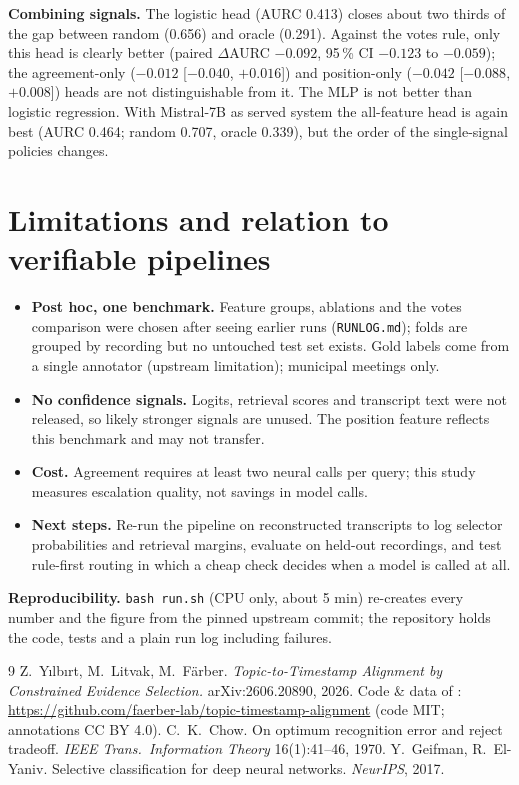 \documentclass[10pt,a4paper]{article}
\begin{document}
\textbf{Combining signals.} The logistic head (AURC 0.413) closes about two thirds of the gap between random (0.656) and oracle (0.291). Against the votes rule, only this head is clearly better (paired $\Delta$AURC $-0.092$, 95\,\% CI $-0.123$ to $-0.059$); the agreement-only ($-0.012$ [$-0.040$, $+0.016$]) and position-only ($-0.042$ [$-0.088$, $+0.008$]) heads are not distinguishable from it. The MLP is not better than logistic regression. With Mistral-7B as served system the all-feature head is again best (AURC 0.464; random 0.707, oracle 0.339), but the order of the single-signal policies changes.

\section{Limitations and relation to verifiable pipelines}
\begin{itemize}
\item \textbf{Post hoc, one benchmark.} Feature groups, ablations and the votes comparison were chosen after seeing earlier runs (\texttt{RUNLOG.md}); folds are grouped by recording but no untouched test set exists. Gold labels come from a single annotator (upstream limitation); municipal meetings only.
\item \textbf{No confidence signals.} Logits, retrieval scores and transcript text were not released, so likely stronger signals are unused. The position feature reflects this benchmark and may not transfer.
\item \textbf{Cost.} Agreement requires at least two neural calls per query; this study measures escalation quality, not savings in model calls.
\item \textbf{Next steps.} Re-run the pipeline on reconstructed transcripts to log selector probabilities and retrieval margins, evaluate on held-out recordings, and test rule-first routing in which a cheap check decides when a model is called at all.
\end{itemize}
\textbf{Reproducibility.} \texttt{bash run.sh} (CPU only, about 5 min) re-creates every number and the figure from the pinned upstream commit; the repository holds the code, tests and a plain run log including failures.

\footnotesize\begin{thebibliography}{9}
 Z.\ Yılbırt, M.\ Litvak, M.\ Färber. \emph{Topic-to-Timestamp Alignment by Constrained Evidence Selection.} arXiv:2606.20890, 2026.
 Code \& data of \cite{yilbirt}: \url{https://github.com/faerber-lab/topic-timestamp-alignment} (code MIT; annotations CC BY 4.0).
 C.\ K.\ Chow. On optimum recognition error and reject tradeoff. \emph{IEEE Trans.\ Information Theory} 16(1):41--46, 1970.
 Y.\ Geifman, R.\ El-Yaniv. Selective classification for deep neural networks. \emph{NeurIPS}, 2017.
\end{thebibliography}
\end{document}

